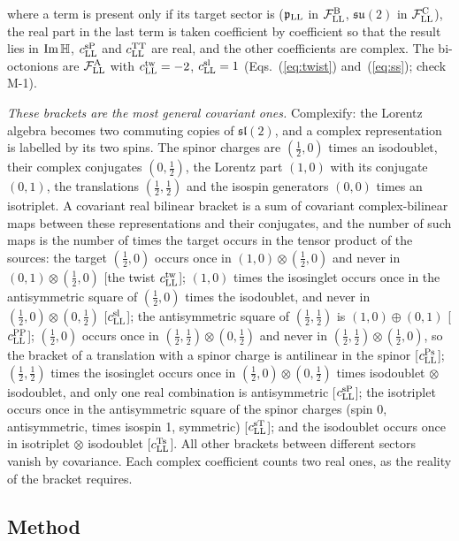 where a term is present only if its target sector is ($\mathfrak p_{\rm LL}$ in $\mathcal F^{\rm B}_{\rm
LL}$, $\mathfrak{su}(2)$ in $\mathcal F^{\rm C}_{\rm LL}$), the real part in the last term is taken
coefficient by coefficient so that the result lies in ${\rm Im}\,\mathbb H$, $c^{\rm sP}_{\rm LL}$ and
$c^{\rm TT}_{\rm LL}$ are real, and the other coefficients are complex. The bi-octonions are
$\mathcal F^{\rm A}_{\rm LL}$ with $c^{\rm tw}_{\rm LL}=-2$, $c^{\rm sl}_{\rm LL}=1$
(Eqs.~(\ref{eq:twist}) and~(\ref{eq:ss}); check M-1).

\emph{These brackets are the most general covariant ones.} Complexify: the Lorentz algebra becomes two
commuting copies of $\mathfrak{sl}(2)$, and a complex representation is labelled by its two spins. The
spinor charges are $(\tfrac12,0)$ times an isodoublet, their complex conjugates $(0,\tfrac12)$, the
Lorentz part $(1,0)$ with its conjugate $(0,1)$, the translations $(\tfrac12,\tfrac12)$ and the
isospin generators $(0,0)$ times an isotriplet. A covariant real bilinear bracket is a sum of covariant
complex-bilinear maps between these representations and their conjugates, and the number of such
maps is the number of times the target occurs in the tensor product of the sources: the target
$(\tfrac12,0)$ occurs once in $(1,0)\otimes(\tfrac12,0)$ and never in $(0,1)\otimes(\tfrac12,0)$ [the
twist $c^{\rm tw}_{\rm LL}$]; $(1,0)$ times the
isosinglet occurs once in the antisymmetric square of $(\tfrac12,0)$ times the isodoublet, and never in
$(\tfrac12,0)\otimes(0,\tfrac12)$ [$c^{\rm sl}_{\rm LL}$]; the antisymmetric square of
$(\tfrac12,\tfrac12)$ is $(1,0)\oplus(0,1)$ [$c^{\rm PP}_{\rm LL}$]; $(\tfrac12,0)$ occurs once in
$(\tfrac12,\tfrac12)\otimes(0,\tfrac12)$ and never in $(\tfrac12,\tfrac12)\otimes(\tfrac12,0)$, so the
bracket of a translation with a spinor charge is antilinear in the spinor [$c^{\rm Ps}_{\rm LL}$];
$(\tfrac12,\tfrac12)$ times the isosinglet occurs once in $(\tfrac12,0)\otimes(0,\tfrac12)$ times
isodoublet $\otimes$ isodoublet, and only one real combination is antisymmetric [$c^{\rm sP}_{\rm LL}$];
the isotriplet occurs once in the antisymmetric square of the spinor charges (spin 0, antisymmetric,
times isospin 1, symmetric) [$c^{\rm sT}_{\rm LL}$]; and the isodoublet occurs once in isotriplet
$\otimes$ isodoublet [$c^{\rm Ts}_{\rm LL}$]. All other brackets between different sectors vanish by
covariance. Each complex coefficient counts two real ones, as the reality of the bracket requires.

\subsection{Method}

